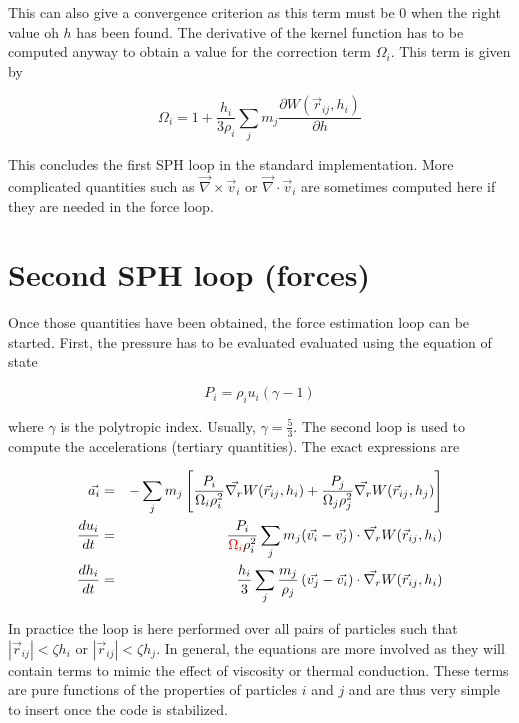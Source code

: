 \documentclass[a4paper,10pt]{article}
\begin{document}
This can also give a convergence criterion as this term must be $0$ when the right value oh $h$ has been found.
The derivative of the kernel function has to be computed anyway to obtain a value for the correction term $\Omega_i$.
This term is given by

\begin{equation}
  \Omega_i = 1 + \frac{h_i}{3\rho_i}\sum_j m_j\frac{\partial W(\vec{r}_{ij},h_i)}{\partial h}
\end{equation}

This concludes the first SPH loop in the standard implementation. More complicated quantities such as
$\vec\nabla\times\vec v_i$ or $\vec\nabla\cdot\vec v_i$ are sometimes computed here if they are needed in the force
loop.

\section{Second SPH loop (forces)}
\label{sec:forces}

Once those quantities have been obtained, the force estimation loop can be started.
First, the pressure has to be evaluated evaluated using the equation of state

\begin{equation}
\label{eq:pressure}
 P_i = \rho_i u_i (\gamma - 1)
\end{equation}

where $\gamma$ is the polytropic index. Usually, $\gamma = \frac{5}{3}$.
The second loop is used to compute the accelerations (tertiary quantities). The exact expressions are

\begin{eqnarray}
 \vec{a_i} &=& - \sum_j m_j\left[\frac{P_i}{\Omega_i\rho_i^2}\vec{\nabla_r} W(\vec{r}_{ij}, h_i) +
\frac{P_j}{\Omega_j\rho_j^2}\vec{\nabla_r}W(\vec{r}_{ij}, h_j) \right] \label{eq:acceleration}\\
 \frac{du_i}{dt} &=& \frac{P_i}{\textcolor{red}{\Omega_i}\rho_i^2} \sum_j m_j
(\vec{v_i}-\vec{v_j})\cdot\vec{\nabla_r} W(\vec{r}_{ij}, h_i)
\label{eq:dudt}\\
 \frac{dh_i}{dt} &=& \frac{h_i}{3}\sum_j \frac{m_j}{\rho_j} \left(\vec{v_j} - \vec{v_i} \right)
\cdot\vec{\nabla_r}W(\vec{r}_{ij},
h_i)
\end{eqnarray}

In practice the loop is here performed over all pairs of particles such that $|\vec{r}_{ij}| < \zeta h_i$ or
$|\vec{r}_{ij}| < \zeta
h_j$. In general, the equations are more involved as they will contain terms to mimic the effect of viscosity or
thermal conduction. These terms are pure functions of the properties of particles $i$ and $j$ and are thus very simple
to insert once the code is stabilized.\\
\end{document}
